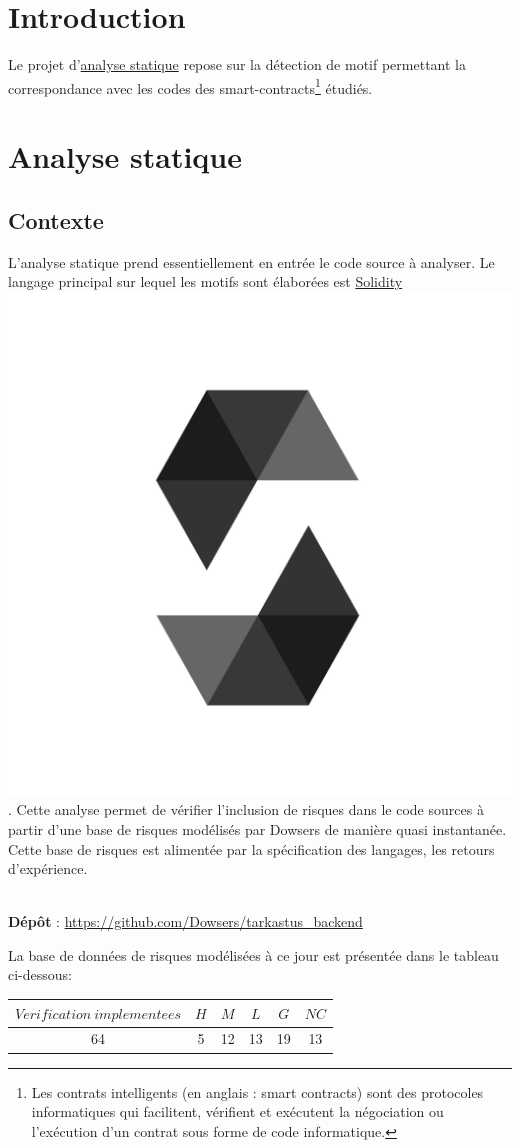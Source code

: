 \documentclass[10pt,a4paper]{article}
\begin{document}
\section{Introduction}
Le projet d'\href{https://fr.wikipedia.org/wiki/Analyse_statique_de_programmes}{analyse statique} repose sur la détection de motif permettant la correspondance avec les codes des smart-contracts\footnote{Les contrats intelligents (en anglais : smart contracts) sont des protocoles informatiques qui facilitent, vérifient et exécutent la négociation ou l'exécution d'un contrat sous forme de code informatique.} étudiés.

\section{Analyse statique}
\subsection{Contexte}
L'analyse statique prend essentiellement en entrée le code source à analyser.
Le langage principal sur lequel les motifs sont élaborées est \href{https://soliditylang.org/}{Solidity}\includegraphics[width = 0.03\linewidth]{./images/solidity_logo.png}.
Cette analyse permet de vérifier l'inclusion de risques dans le code sources à partir d'une base de risques modélisés par Dowsers de manière quasi instantanée.
Cette base de risques est alimentée par la spécification des langages, les retours d'expérience.
\\
\\
\begin{center}
\textbf{Dépôt} : \url{https://github.com/Dowsers/tarkastus_backend}\\
\end{center}

La base de données de risques modélisées à ce jour est présentée dans le tableau ci-dessous:
\begin{center}
\begin{tabular}{|c|c|c|c|c|c|}
\hline 
$Verification\ implementees$ & $H$ & $M$ & $L$ & $G$ & $NC$\\ 
\hline 
64 & 5 & 12 & 13 & 19 & 13\\ 
\hline 
\end{tabular}
\end{center}
\end{document}
